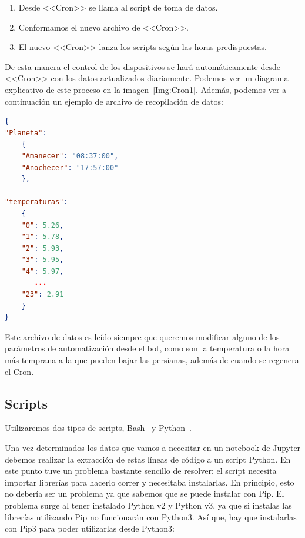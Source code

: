 \begin{enumerate}
    \item Desde <<Cron>> se llama al script de toma de datos.
    \item Conformamos el nuevo archivo de <<Cron>>.
    \item El nuevo <<Cron>> lanza los scripts según las horas predispuestas.
\end{enumerate}

De esta manera el control de los dispositivos se hará automáticamente desde <<Cron>> con los datos actualizados diariamente. Podemos ver un diagrama explicativo de este proceso en la imagen~\ref{Img:Cron1}. Además, podemos ver a continuación un ejemplo de archivo de recopilación de datos:

\begin{minipage}{\linewidth}
\begin{lstlisting}[language=json, basicstyle=\small, caption={Ejemplo archivo de recopilado de datos.}, label={lst:Ejemplo}]
{
"Planeta":
	{
	"Amanecer": "08:37:00",
	"Anochecer": "17:57:00"
	},

"temperaturas":
	{
	"0": 5.26,
	"1": 5.78,
	"2": 5.93,
	"3": 5.95,
	"4": 5.97,
	   ...
	"23": 2.91
	}
}
\end{lstlisting}
\end{minipage}



Este archivo de datos es leído siempre que queremos modificar alguno de los parámetros de automatización desde el bot, como son la temperatura o la hora más temprana a la que pueden bajar las persianas, además de cuando se regenera el Cron.

\subsection{Scripts}
Utilizaremos dos tipos de scripts, Bash~\cite{misc:Linux} y Python~\cite{misc:Python}.

Una vez determinados los datos que vamos a necesitar en un notebook de Jupyter debemos realizar la extracción de estas líneas de código a un script Python.
En este punto tuve un problema bastante sencillo de resolver: el script necesita importar librerías para hacerlo correr y necesitaba instalarlas. En principio, esto no debería ser un problema ya que sabemos que se puede instalar con Pip. El problema surge al tener instalado Python v2 y Python v3, ya que si instalas las librerías utilizando Pip no funcionarán con Python3. Así que, hay que instalarlas con Pip3 para poder utilizarlas desde Python3:


